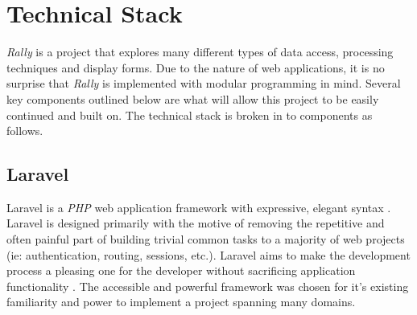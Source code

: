 \documentclass[msc,oneside]{ubcthesis}%
\begin{document}
\chapter{Technical Stack}
\textit{Rally} is a project that explores many different types of data access, processing techniques and display forms. Due to the nature of web applications, it is no surprise that \textit{Rally} is implemented with modular programming in mind. Several key components outlined below are what will allow this project to be easily continued and built on. The technical stack is broken in to components as follows.

\section{Laravel}
Laravel is a \textit{PHP} web application framework with expressive, elegant syntax \citep{Laravel}. Laravel is designed primarily with the motive of removing the repetitive and often painful part of building trivial common tasks to a majority of web projects (ie: authentication, routing, sessions, etc.). Laravel aims to make the development process a pleasing one for the developer without sacrificing application functionality \citep{Laravel}. The accessible and powerful framework was chosen for it's existing familiarity and power to implement a project spanning many domains.
\end{document}
